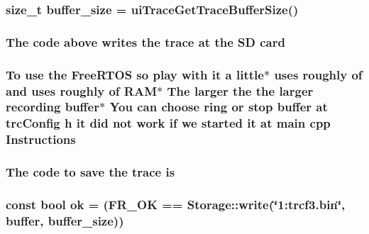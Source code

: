 {{\subsubsection[{\texorpdfstring{buffer\+\_\+size}{buffer_size}}]{\setlength{\rightskip}{0pt plus 5cm}size\+\_\+t buffer\+\_\+size = {\bf ui\+Trace\+Get\+Trace\+Buffer\+Size}()}\hypertarget{trace_2readme_8txt_a799a743b3abd553a37fc01ad3097df08}{}\label{trace_2readme_8txt_a799a743b3abd553a37fc01ad3097df08}
\subsubsection[{\texorpdfstring{card}{card}}]{\setlength{\rightskip}{0pt plus 5cm}The code above writes the {\bf trace} at the SD card}\hypertarget{trace_2readme_8txt_a0d1fd70c70215609966800df0223784b}{}\label{trace_2readme_8txt_a0d1fd70c70215609966800df0223784b}
\subsubsection[{\texorpdfstring{Instructions}{Instructions}}]{\setlength{\rightskip}{0pt plus 5cm}To use the Free\+R\+T\+OS so play with it a little$\ast$ uses roughly of and uses roughly of {\bf R\+AM}$\ast$ The larger the the larger recording {\bf buffer}$\ast$ You can choose ring or stop {\bf buffer} at trc\+Config h it did not work if we started it at {\bf main} cpp Instructions}\hypertarget{trace_2readme_8txt_a01807876ea43790d1481e4f6b6e7b08f}{}\label{trace_2readme_8txt_a01807876ea43790d1481e4f6b6e7b08f}
\subsubsection[{\texorpdfstring{is}{is}}]{\setlength{\rightskip}{0pt plus 5cm}The code to save the {\bf trace} is}\hypertarget{trace_2readme_8txt_a7e33a55c77d8cbd03ec57a69d78a39dc}{}\label{trace_2readme_8txt_a7e33a55c77d8cbd03ec57a69d78a39dc}
\subsubsection[{\texorpdfstring{ok}{ok}}]{\setlength{\rightskip}{0pt plus 5cm}const bool ok = ({\bf F\+R\+\_\+\+OK} == {\bf Storage\+::write}(\char`\"{}1\+:trcf3.\+bin\char`\"{}, buffer, {\bf buffer\+\_\+size}))}\hypertarget{trace_2readme_8txt_ab1dec86efb716110c1bbcfec4dda55f1}{}\label{trace_2readme_8txt_ab1dec86efb716110c1bbcfec4dda55f1}
}}
